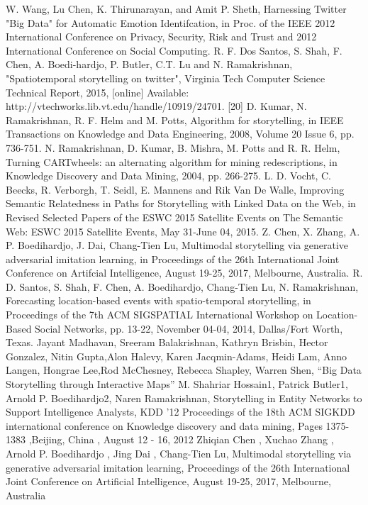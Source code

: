 \documentclass[conference]{IEEEtran}
\begin{document}
\begin{thebibliography}{12}
\bibitem {} W. Wang, Lu Chen, K. Thirunarayan, and Amit P. Sheth, Harnessing Twitter "Big Data" for Automatic Emotion Identifcation, in Proc. of the IEEE 2012 International Conference on Privacy, Security, Risk and Trust and 2012 International Conference on Social Computing.
\bibitem {} R. F. Dos Santos, S. Shah, F. Chen, A. Boedi-hardjo, P. Butler, C.T. Lu and N. Ramakrishnan, "Spatiotemporal storytelling on twitter", Virginia Tech Computer Science Technical Report, 2015, [online] Available: http://vtechworks.lib.vt.edu/handle/10919/24701.
[20] D. Kumar, N. Ramakrishnan, R. F. Helm and M. Potts, Algorithm for storytelling, in IEEE Transactions on Knowledge and Data Engineering, 2008, Volume 20 Issue
6, pp. 736-751.
\bibitem {} N. Ramakrishnan, D. Kumar, B. Mishra, M. Potts and R. R. Helm, Turning CARTwheels: an alternating algorithm for mining redescriptions, in Knowledge Discovery and Data Mining, 2004, pp. 266-275.
\bibitem {} L. D. Vocht, C. Beecks, R. Verborgh, T. Seidl, E. Mannens and Rik Van De Walle, Improving Semantic Relatedness in Paths for Storytelling with Linked Data on the Web, in Revised Selected Papers of the ESWC 2015 Satellite Events on The Semantic Web: ESWC 2015 Satellite Events, May 31-June 04, 2015.
\bibitem {} Z. Chen, X. Zhang, A. P. Boedihardjo, J. Dai, Chang-Tien Lu, Multimodal storytelling via generative adversarial imitation learning, in Proceedings of the 26th International Joint Conference on Artifcial Intelligence, August 19-25, 2017, Melbourne, Australia.
\bibitem {} R. D. Santos, S. Shah, F. Chen, A. Boedihardjo, Chang-Tien Lu, N. Ramakrishnan, Forecasting location-based events with spatio-temporal storytelling, in Proceedings of the 7th ACM SIGSPATIAL International Workshop on Location-Based Social Networks, pp. 13-22, November 04-04, 2014, Dallas/Fort Worth, Texas.
\bibitem {} Jayant Madhavan, Sreeram Balakrishnan, Kathryn Brisbin, Hector Gonzalez, Nitin Gupta,Alon Halevy, Karen Jacqmin-Adams, Heidi Lam, Anno Langen, Hongrae Lee,Rod McChesney, Rebecca Shapley, Warren Shen, “Big Data Storytelling through Interactive Maps”
\bibitem {} M. Shahriar Hossain1, Patrick Butler1, Arnold P. Boedihardjo2, Naren Ramakrishnan, Storytelling in Entity Networks to Support Intelligence Analysts, KDD '12 Proceedings of the 18th ACM SIGKDD international conference on Knowledge discovery and data mining, Pages 1375-1383 ,Beijing, China , August 12 - 16, 2012
\bibitem {} Zhiqian Chen , Xuchao Zhang , Arnold P. Boedihardjo , Jing Dai , Chang-Tien Lu, Multimodal storytelling via generative adversarial imitation learning, Proceedings of the 26th International Joint Conference on Artificial Intelligence, August 19-25, 2017, Melbourne, Australia 

\end{thebibliography}
\end{document}

